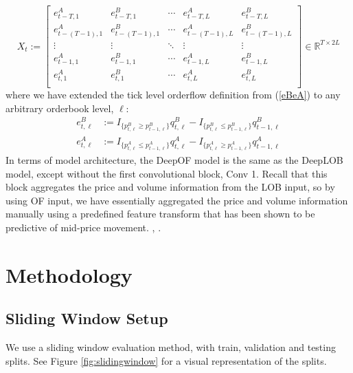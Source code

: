 \begin{equation}
X_{t} := \begin{bmatrix}
e_{t-T, 1}^A & e_{t-T, 1}^B &   \cdots & e_{t-T, L}^A & e_{t-T, L}^B \\
e_{t-(T-1), 1}^A & e_{t-(T-1), 1}^B &   \cdots & e_{t-(T-1), L}^A & e_{t-(T-1), L}^B \\
\vdots & \vdots & \ddots & \vdots & \vdots \\
e_{t-1, 1}^A & e_{t-1, 1}^B &  \cdots & e_{t-1, L}^A & e_{t-1, L}^B \\
e_{t, 1}^A & e_{t, 1}^B &  \cdots & e_{t, L}^A & e_{t, L}^B \\
\end{bmatrix} \in \mathbb{R}^{T \times 2L}
\label{DeepLOB_input}
\end{equation}
where we have extended the tick level orderflow definition from (\ref{eBeA}) to any arbitrary orderbook level, $\ell$:
\begin{equation}
    \begin{aligned}
        e_{t, \ell}^B &:= I_{\{p_{t, \ell}^B \ge p_{t-1, \ell}^B\}} q_{t, \ell}^B - I_{\{p_{t, \ell}^B \le p_{t-1, \ell}^B\}} q_{t-1, \ell}^B \\
        e_{t, \ell}^A &:= I_{\{p_{t, \ell}^A \le p_{t-1, \ell}^A\}} q_{t, \ell}^A - I_{\{p_{t, \ell}^A \ge p_{t-1, \ell}^A\}} q_{t-1, \ell}^A
    \end{aligned}
\end{equation}
In terms of model architecture, the DeepOF model is the same as the DeepLOB model, except without
the first convolutional block, Conv 1. Recall that this block aggregates the price and volume information
from the LOB input, so by using OF input, we have essentially aggregated the price and volume information manually
using a predefined feature transform that has been shown to be predictive of mid-price movement. \cite{CONT2013}, \cite{KOLM2023}.

\section{Methodology}

\subsection{Sliding Window Setup}
We use a sliding window evaluation method, with train, validation and testing splits.
See Figure \ref{fig:slidingwindow} for a visual representation
of the splits.

